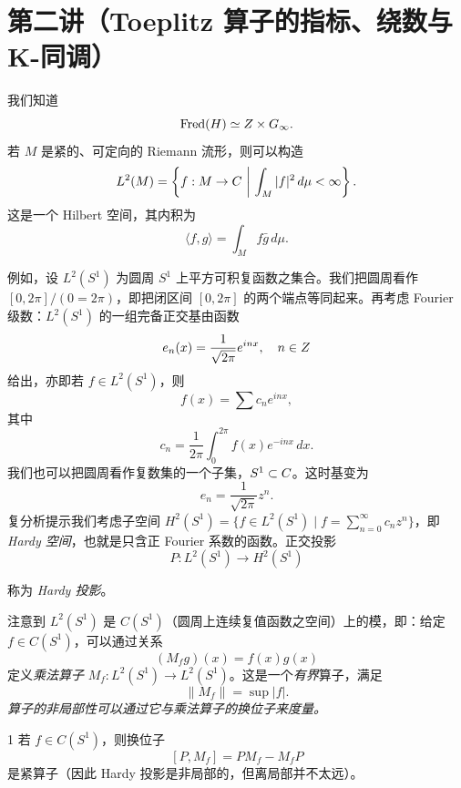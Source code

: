
\section{第二讲（Toeplitz 算子的指标、绕数与 K-同调）}

我们知道
\[ \operatorname{Fred}(H)\simeq Z\times G_\infty. \]
若 $M$ 是紧的、可定向的 Riemann 流形，则可以构造
\[ L^2(M)=\left\{f:M\to C\ \middle|\ \int_M |f|^2\,d\mu<\infty\right\}. \]
这是一个 Hilbert 空间，其内积为
\[ \langle f,g\rangle=\int_M f\bar g\,d\mu. \]


例如，设 $L^2(S^1)$ 为圆周 $S^1$ 上平方可积复函数之集合。我们把圆周看作 $[0,2\pi]/(0=2\pi)$，即把闭区间 $[0,2\pi]$ 的两个端点等同起来。再考虑 Fourier 级数：$L^2(S^1)$ 的一组完备正交基由函数
\[ e_n(x)=\frac{1}{\sqrt{2\pi}}e^{inx},\quad n\in Z \]
给出，亦即若 $f\in L^2(S^1)$，则
\[ f(x)=\sum c_n e^{inx}, \]
其中
\[ c_n=\frac{1}{2\pi}\int_0^{2\pi} f(x)e^{-inx}\,dx. \]
我们也可以把圆周看作复数集的一个子集，$S^1\subset C$。这时基变为
\[ e_n=\frac{1}{\sqrt{2\pi}}z^n. \]
复分析提示我们考虑子空间 $H^2(S^1)=\{f\in L^2(S^1)\mid f=\sum_{n=0}^{\infty}c_nz^n\}$，即 \emph{Hardy 空间}，也就是只含正 Fourier 系数的函数。正交投影
\[ P: L^2(S^1)\to H^2(S^1) \]


称为 \emph{Hardy 投影}。

注意到 $L^2(S^1)$ 是 $C(S^1)$（圆周上连续复值函数之空间）上的模，即：给定 $f\in C(S^1)$，可以通过关系
\[ (M_f g)(x)=f(x)g(x) \]
定义\emph{乘法算子} $M_f: L^2(S^1)\to L^2(S^1)$。这是一个\emph{有界}算子，满足
\[ \|M_f\|=\sup|f|. \]
\emph{算子的非局部性可以通过它与乘法算子的换位子来度量。}

\begin{lem}{1}
若 $f\in C(S^1)$，则换位子
\[ [P,M_f]=PM_f-M_fP \]
是紧算子（因此 Hardy 投影是非局部的，但离局部并不太远）。
\end{lem}

